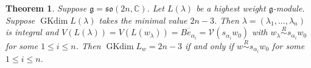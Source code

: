 \documentclass{amsart}[12pt]
\newtheorem{Thm}[Lem]{Theorem}
\newcommand{\gkd}{\operatorname{GKdim}}
\numberwithin{equation}{section}
\begin{document}
\begin{Thm}\label{m23}
	Suppose $\mathfrak{g}=\mathfrak{so }(2n, \mathbb{C})$. Let $L(\lambda)$ be a highest weight $\mathfrak{g}$-module. Suppose $\gkd L(\lambda)$ takes the minimal value $2n-3$. Then
$\lambda=(\lambda_1,...,\lambda_n)$ is integral and $V(L(\lambda))=V(L(w_{\lambda}))=\overline{Be_{\alpha_i}}=\mathcal{V}(s_{\alpha_i}w_0)$ with $w_{\lambda}\stackrel{R}{\sim}s_{\alpha_{i}}w_0$ for some $1\leq i\leq n$. Then $\gkd L_w=2n-3$ if and only if   $w \stackrel{R}{\sim} s_{\alpha_{i}}w_0$  for some $1\leq i\leq n$.
\end{Thm}



%
%
%
%



\end{document}
